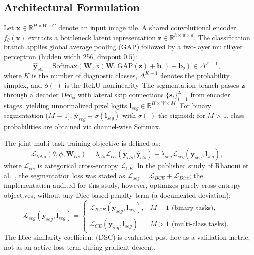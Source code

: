 \documentclass[runningheads]{llncs}
\begin{document}
\subsection{Architectural Formulation}
Let $\mathbf{x} \in \mathbb{R}^{H \times W \times C}$ denote an input image tile. A shared convolutional encoder $f_\theta(\mathbf{x})$ extracts a bottleneck latent representation $\mathbf{z} \in \mathbb{R}^{h \times w \times d}$. The classification branch applies global average pooling (GAP) followed by a two-layer multilayer perceptron (hidden width 256, dropout $0.5$):
\begin{equation}
    \hat{\mathbf{y}}_{cls} = \text{Softmax}\!\left(\mathbf{W}_2\,\phi\!\left(\mathbf{W}_1\,\text{GAP}(\mathbf{z}) + \mathbf{b}_1\right) + \mathbf{b}_2\right) \in \Delta^{K-1},
\end{equation}
where $K$ is the number of diagnostic classes, $\Delta^{K-1}$ denotes the probability simplex, and $\phi(\cdot)$ is the ReLU nonlinearity. The segmentation branch passes $\mathbf{z}$ through a decoder $\text{Dec}_\phi$ with lateral skip connections $\{\mathbf{s}_l\}_{l=1}^L$ from encoder stages, yielding unnormalized pixel logits $\mathbf{l}_{seg} \in \mathbb{R}^{H \times W \times M}$. For binary segmentation ($M=1$), $\hat{\mathbf{y}}_{seg} = \sigma(\mathbf{l}_{seg})$ with $\sigma(\cdot)$ the sigmoid; for $M > 1$, class probabilities are obtained via channel-wise Softmax.

The joint multi-task training objective is defined as:
\begin{equation}
    \mathcal{L}_{total}(\theta, \phi, \mathbf{W}_{cls}) = \lambda_{cls} \mathcal{L}_{cls}(\mathbf{y}_{cls}, \hat{\mathbf{y}}_{cls}) + \lambda_{seg} \mathcal{L}_{seg}(\mathbf{y}_{seg}, \mathbf{l}_{seg}),
\end{equation}
where $\mathcal{L}_{cls}$ is categorical cross-entropy $\mathcal{L}_{CE}$. In the published study of Rhanoui et al.~\cite{rhanoui2025multitask}, the segmentation loss was stated as $\mathcal{L}_{seg} = \mathcal{L}_{BCE} + \mathcal{L}_{Dice}$; the implementation audited for this study, however, optimizes purely cross-entropy objectives, without any Dice-based penalty term (a documented deviation):
\begin{equation}
    \mathcal{L}_{seg}(\mathbf{y}_{seg}, \mathbf{l}_{seg}) = 
    \begin{cases}
        \mathcal{L}_{BCE}(\mathbf{y}_{seg}, \mathbf{l}_{seg}), & M = 1 \text{ (binary tasks)}, \\
        \mathcal{L}_{CE}(\mathbf{y}_{seg}, \mathbf{l}_{seg}), & M > 1 \text{ (multi-class tasks)}.
    \end{cases}
\end{equation}
The Dice similarity coefficient (DSC) is evaluated post-hoc as a validation metric, not as an active loss term during gradient descent.
\end{document}
